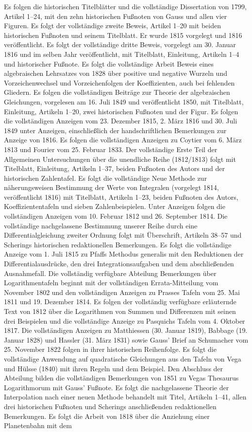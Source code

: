 Es folgen die historischen Titelblätter und die vollständige Dissertation von 1799, Artikel 1–24, mit den zehn historischen Fußnoten von Gauss und allen vier Figuren. Es folgt der vollständige zweite Beweis, Artikel 1–20 mit beiden historischen Fußnoten und seinem Titelblatt. Er wurde 1815 vorgelegt und 1816 veröffentlicht. Es folgt der vollständige dritte Beweis, vorgelegt am 30. Januar 1816 und im selben Jahr veröffentlicht, mit Titelblatt, Einleitung, Artikeln 1–4 und historischer Fußnote. Es folgt die vollständige Arbeit Beweis eines algebraischen Lehrsatzes von 1828 über positive und negative Wurzeln und Vorzeichenwechsel und Vorzeichenfolgen der Koeffizienten, auch bei fehlenden Gliedern. Es folgen die vollständigen Beiträge zur Theorie der algebraischen Gleichungen, vorgelesen am 16. Juli 1849 und veröffentlicht 1850, mit Titelblatt, Einleitung, Artikeln 1–20, zwei historischen Fußnoten und der Figur. Es folgen die vollständigen Anzeigen vom 23. Dezember 1815, 2. März 1816 und 30. Juli 1849 unter Anzeigen, einschließlich der handschriftlichen Bemerkungen zur Anzeige von 1816. Es folgen die vollständigen Anzeigen zu Coytier vom 6. März 1813 und Fourier vom 25. Februar 1833. Der vollständige Erste Teil der Allgemeinen Untersuchungen über die unendliche Reihe (1812/1813) folgt mit Titelblatt, Einleitung, Artikeln 1–37, beiden Fußnoten des Autors und der historischen Zahlentafel. Es folgt die vollständige Neue Methode zur näherungsweisen Bestimmung der Werte von Integralen (vorgelegt 1814, veröffentlicht 1816) mit Titelblatt, Artikeln 1–23, beiden Fußnoten des Autors, Koeffiziententafeln und sieben Zahlenbeispielen. Unter Anzeigen folgen die vollständigen Anzeigen vom 10. Februar 1812 und 26. September 1814. Die vollständige nachgelassene Bestimmung unserer Reihe durch eine Differentialgleichung zweiter Ordnung folgt mit Überschrift, Artikeln 38–57 und Scherings historischen redaktionellen Bemerkungen. Es folgt die vollständige Anzeige vom 1. Juli 1815 zu Pfaffs Methodus generalis mit den Reduktionen der Differentialausdrücke, den drei Integrationsaufgaben und dem abschließenden Ausnahmefall. Die vollständig verfügbare Abteilung Bemerkungen über Logarithmentafeln beginnt mit der vollständigen Errata-Mitteilung vom November 1802 und den vollständigen Anzeigen zu Prasses Tafeln vom 25. Mai 1811 und 19. Dezember 1814. Es folgen der vollständig verfügbare erläuternde Text von 1812 über die Logarithmen von Summen und Differenzen mit seinen drei Beispielen und die vollständige Anzeige zu Pasquichs Tafeln vom 4. Oktober 1817. Die vollständigen Anzeigen zu Matthiessen (30. Januar 1819), Babbage (19. Januar 1828) und Hassler (31. März 1831) sowie Gauss’ Brief an Schumacher vom 25. November 1822 folgen in ihrer historischen Reihenfolge. Es folgt die vollständige Anwendung auf quadratische Gleichungen aus den Tafeln von Vega und Hülsse (1840) mit ihren Regeln und dem Beispiel. Den Abschluss der Abteilung bilden die vollständigen Bemerkungen von 1851 zu Vegas Thesaurus Logarithmorum mit Gauss’ Fußnote. Es folgt die nachgelassene Theorie der Interpolation nach einer neuen Methode behandelt mit Titel, Artikeln 1–41, allen drei historischen Fußnoten und Scherings anschließenden redaktionellen Bemerkungen. Es folgt die Arbeit von 1818 über die Anziehung einer Planetenbahn mit dem 